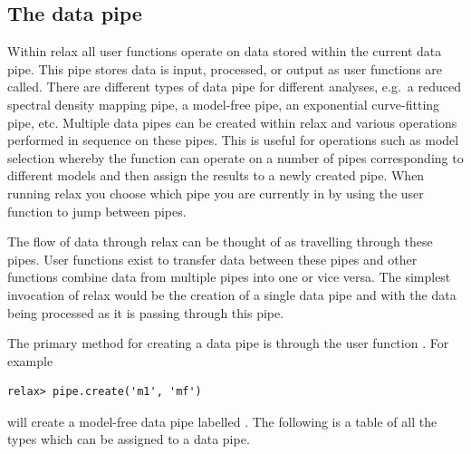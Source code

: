 
\subsection{The data pipe} \label{sect: the data pipe}

Within relax all user functions operate on data stored within the current data pipe.
This pipe stores data is input, processed, or output as user functions are called.
There are different types of data pipe for different analyses, e.g.\ a reduced spectral density mapping pipe, a model-free pipe, an exponential curve-fitting pipe, etc.
Multiple data pipes can be created within relax and various operations performed in sequence on these pipes.
This is useful for operations such as model selection whereby the function  can operate on a number of pipes corresponding to different models and then assign the results to a newly created pipe.
When running relax you choose which pipe you are currently in by using the  user function to jump between pipes.

The flow of data through relax can be thought of as travelling through these pipes.
User functions exist to transfer data between these pipes and other functions combine data from multiple pipes into one or vice versa.
The simplest invocation of relax would be the creation of a single data pipe and with the data being processed as it is passing through this pipe.

The primary method for creating a data pipe is through the user function .
For example

\begin{lstlisting}[numbers=none]
relax> pipe.create('m1', 'mf')
\end{lstlisting}

will create a model-free data pipe labelled .
The following is a table of all the types which can be assigned to a data pipe.

